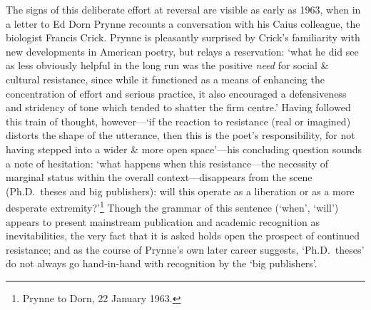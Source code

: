 \documentclass[]{article}
\begin{document}
The signs of this deliberate effort at reversal are visible as early as
1963, when in a letter to Ed Dorn Prynne recounts a conversation with
his Caius colleague, the biologist Francis Crick. Prynne is pleasantly
surprised by Crick's familiarity with new developments in American
poetry, but relays a reservation: `what he did see as less obviously
helpful in the long run was the positive \emph{need} for social \&
cultural resistance, since while it functioned as a means of enhancing
the concentration of effort and serious practice, it also encouraged a
defensiveness and stridency of tone which tended to shatter the firm
centre.' Having followed this train of thought, however---`if the
reaction to resistance (real or imagined) distorts the shape of the
utterance, then this is the poet's responsibility, for not having
stepped into a wider \& more open space'---his concluding question
sounds a note of hesitation: `what happens when this resistance---the
necessity of marginal status within the overall context---disappears
from the scene (Ph.D.~theses and big publishers): will this operate as a
liberation or as a more desperate extremity?'\footnote{Prynne to Dorn,
  22 January 1963.} Though the grammar of this sentence (`when', `will')
appears to present mainstream publication and academic recognition as
inevitabilities, the very fact that it is asked holds open the prospect
of continued resistance; and as the course of Prynne's own later career
suggests, `Ph.D.~theses' do not always go hand-in-hand with recognition
by the `big publishers'.
\end{document}
